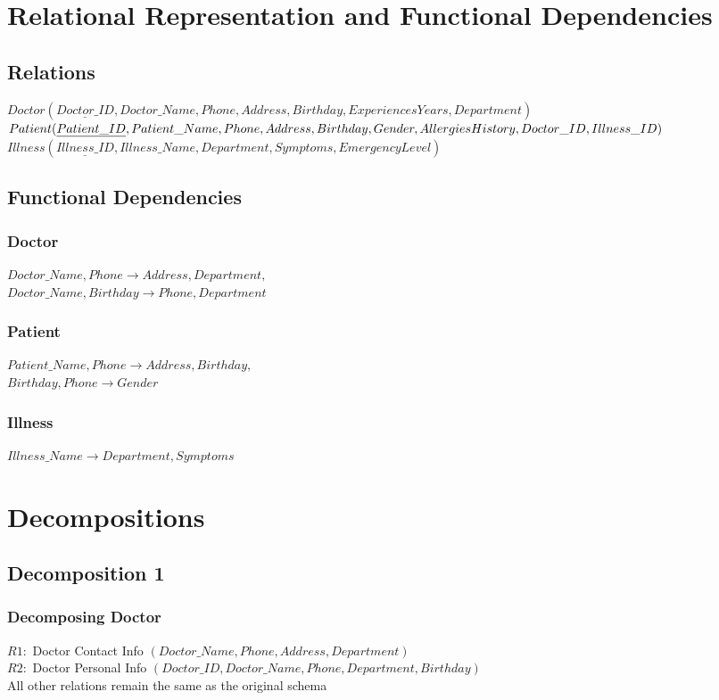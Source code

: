 \documentclass[12pt,arial]{article}
\begin{document}
\section{Relational Representation and Functional Dependencies}
\subsection{Relations}
$Doctor (\underline{Doctor\_ID}, Doctor\_Name, Phone, Address, Birthday, Experiences Years, Department) $\\
$Patient (\underline{Patient\_ID}, Patient\_Name, Phone, Address, Birthday, \\ Gender, Allergies History, Doctor\_ID, Illness\_ID) $\\
$Illness (\underline{Illness\_ID}, Illness\_Name, Department, Symptoms, Emergency Level) $\\
\subsection{Functional Dependencies}
\subsubsection{Doctor}
$Doctor\_Name, Phone \rightarrow Address, Department, $\\
$Doctor\_Name, Birthday \rightarrow Phone, Department$
\subsubsection{Patient}
$ Patient\_Name, Phone \rightarrow Address, Birthday, $\\
 $Birthday, Phone \rightarrow Gender$
\subsubsection{Illness}
$Illness\_Name \rightarrow Department, Symptoms$
\section{Decompositions}
\subsection{Decomposition 1}
\subsubsection{Decomposing Doctor}
$R1:$ Doctor Contact Info $(Doctor\_Name, Phone, Address, Department)$\\
$R2:$ Doctor Personal Info $(Doctor\_ID, Doctor\_Name, Phone, Department, Birthday)$ \\ \hfil \break
All other relations remain the same as the original schema
\end{document}
